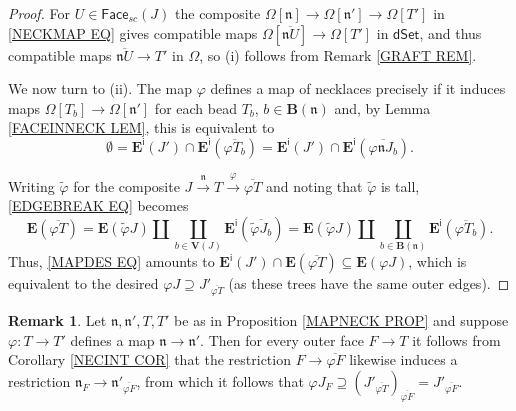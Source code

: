 \documentclass[a4paper,10pt]{article}%
\numberwithin{equation}{section}
\numberwithin{figure}{section}
\theoremstyle{definition} %
\newtheorem{remark}[equation]{Remark}%
\begin{document}
\begin{proof}
	For $U \in \mathsf{Face}_{sc}(J)$
	the composite
	$\Omega[\mathfrak{n}] \to 
	\Omega[\mathfrak{n}'] \to 
	\Omega[T']$
	in \eqref{NECKMAP EQ}
	gives compatible maps
	$\Omega[\overline{\mathfrak{n} U}] \to \Omega[T']$
	in $\mathsf{dSet}$,
	and thus compatible maps
	$\overline{\mathfrak{n} U} \to T'$ 
	in $\Omega$,
	so (i) follows from 
	Remark \ref{GRAFT REM}.

	We now turn to (ii).
	The map $\varphi$ defines a map of necklaces 
	precisely if it induces maps
	$\Omega[T_b] \to \Omega[\mathfrak{n}']$
	for each bead 
	$T_b$, $b \in \boldsymbol{B}(\mathfrak n)$
	and, by Lemma \ref{FACEINNECK LEM},
	this is equivalent to
	\begin{equation}\label{MAPDES EQ}
	\emptyset
	=
	\boldsymbol{E}^{\mathsf{i}}(J')
	\cap
	\boldsymbol{E}^{\mathsf{i}}(\overline{ \varphi T_b})
	=
	\boldsymbol{E}^{\mathsf{i}}(J')
	\cap
	\boldsymbol{E}^{\mathsf{i}}(\overline{ \varphi \mathfrak{n} J_b}).
	\end{equation}
	
	Writing $\tilde{\varphi}$ for the composite
	$
	J \xrightarrow{\mathfrak n} T 
	\xrightarrow{\varphi} \overline{\varphi T}
	$
	and noting that $\tilde{\varphi}$ is tall,
	\eqref{EDGEBREAK EQ} becomes 
	\begin{equation}\label{DECOMPPR EQ}
	\boldsymbol{E}(\overline{\varphi T})
	=
	\boldsymbol{E}(\tilde{\varphi} J)
	\amalg
	\coprod_{b \in \boldsymbol{V}(J)}
	\boldsymbol{E}^{\mathsf{i}}(\overline{\tilde{\varphi} J_b})
	=
	\boldsymbol{E}(\tilde{\varphi} J)
	\amalg
	\coprod_{b \in \boldsymbol{B}(\mathfrak n)}
	\boldsymbol{E}^{\mathsf{i}}(\overline{\varphi T_b}).
	\end{equation}
	Thus, \eqref{MAPDES EQ}
	amounts to
	$\boldsymbol{E}^{\mathsf{i}}(J') \cap 
	\boldsymbol{E}(\overline{\varphi T})
	\subseteq
	\boldsymbol{E}(\varphi J)$,
	which is equivalent to the desired
	$\varphi J \supseteq J'_{\overline{\varphi T}}$
	(as these trees have the same outer edges).
\end{proof}



\begin{remark}\label{NECKMAPCHAR REM}
	Let $\mathfrak{n},\mathfrak{n}',T,T'$ be as in
	Proposition \ref{MAPNECK PROP}
	and suppose 
	$\varphi \colon T \to T'$
	defines a map
	$\mathfrak{n} \to \mathfrak{n}'$.
	Then for every outer face $F \to T$
	it follows from 
	Corollary \ref{NECINT COR}
	that the restriction 
	$F \to \overline{\varphi F}$
	likewise induces a restriction
	$\mathfrak{n}_F \to \mathfrak{n}'_{\overline{\varphi F}}$,
	from which it follows that
	$\varphi J_F \supseteq 
	\left(J'_{\overline{\varphi T}}\right)_{\overline{\varphi F}}
	=
	J'_{\overline{\varphi F}}$.
\end{remark}
\end{document}
